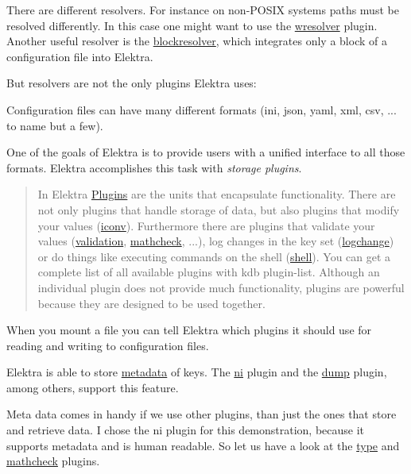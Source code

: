 There are different resolvers. For instance on non-\/\+P\+O\+S\+IX systems paths must be resolved differently. In this case one might want to use the \hyperlink{autotoc_md772_src_plugins_wresolver_README_md}{wresolver} plugin. Another useful resolver is the \hyperlink{autotoc_md64_src_plugins_blockresolver_README_md}{blockresolver}, which integrates only a block of a configuration file into Elektra.

But resolvers are not the only plugins Elektra uses\+:

Configuration files can have many different formats ({\ttfamily ini}, {\ttfamily json}, {\ttfamily yaml}, {\ttfamily xml}, {\ttfamily csv}, ... to name but a few).

One of the goals of Elektra is to provide users with a unified interface to all those formats. Elektra accomplishes this task with {\itshape storage plugins}.

\begin{quote}
In Elektra \hyperlink{doc_tutorials_plugins_md}{Plugins} are the units that encapsulate functionality. There are not only plugins that handle storage of data, but also plugins that modify your values (\hyperlink{autotoc_md283_src_plugins_iconv_README_md}{iconv}). Furthermore there are plugins that validate your values (\hyperlink{autotoc_md767_src_plugins_validation_README_md}{validation}, \hyperlink{autotoc_md374_src_plugins_mathcheck_README_md}{mathcheck}, ...), log changes in the key set (\hyperlink{autotoc_md362_src_plugins_logchange_README_md}{logchange}) or do things like executing commands on the shell (\hyperlink{autotoc_md604_src_plugins_shell_README_md}{shell}). You can get a complete list of all available plugins with {\ttfamily kdb plugin-\/list}. Although an individual plugin does not provide much functionality, plugins are powerful because they are designed to be used together. \end{quote}


When you mount a file you can tell Elektra which plugins it should use for reading and writing to configuration files.

Elektra is able to store \hyperlink{doc_help_elektra-metadata_md}{metadata} of keys. The \hyperlink{autotoc_md475_src_plugins_ni_README_md}{ni} plugin and the \hyperlink{autotoc_md194_src_plugins_dump_README_md}{dump} plugin, among others, support this feature.

Meta data comes in handy if we use other plugins, than just the ones that store and retrieve data. I chose the {\ttfamily ni} plugin for this demonstration, because it supports metadata and is human readable. So let us have a look at the \hyperlink{autotoc_md752_src_plugins_type_README_md}{type} and \hyperlink{autotoc_md374_src_plugins_mathcheck_README_md}{mathcheck} plugins.


